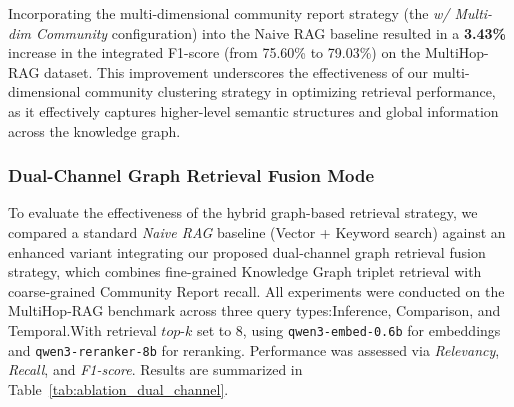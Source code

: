 \documentclass[11pt]{article}
\begin{document}
Incorporating the multi-dimensional community report strategy (the \textit{w/ Multi-dim Community} configuration) into the Naive RAG baseline resulted in a \textbf{3.43\%} increase in the integrated F1-score (from 75.60\% to 79.03\%) on the MultiHop-RAG dataset. This improvement underscores the effectiveness of our multi-dimensional community clustering strategy in optimizing retrieval performance, as it effectively captures higher-level semantic structures and global information across the knowledge graph.

\subsubsection{Dual-Channel Graph Retrieval Fusion Mode}

To evaluate the effectiveness of the hybrid graph-based retrieval strategy, we compared a standard \textit{Naive RAG} baseline (Vector + Keyword search) against an enhanced variant integrating our proposed dual-channel graph retrieval fusion strategy, which combines fine-grained Knowledge Graph triplet retrieval with coarse-grained Community Report recall. All experiments were conducted on the MultiHop-RAG benchmark across three query types:Inference, Comparison, and Temporal.With retrieval $top\text{-}k$ set to 8, using \texttt{qwen3-embed-0.6b} for embeddings and \texttt{qwen3-reranker-8b} for reranking. Performance was assessed via \textit{Relevancy}, \textit{Recall}, and \textit{F1-score}. Results are summarized in Table~\ref{tab:ablation_dual_channel}.
\end{document}
